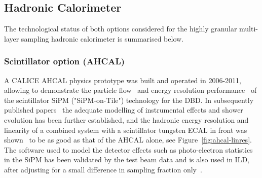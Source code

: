 \subsection{Hadronic Calorimeter}
\label{ild:sec:HCAL}

The technological status of both options considered for the highly granular multi-layer sampling hadronic calorimeter is summarised below. 

\subsubsection{Scintillator option (AHCAL)}

A CALICE AHCAL physics prototype was built and operated in 2006-2011, allowing to demonstrate the particle flow~\cite{Adloff:2011ha} and energy resolution performance~\cite{Adloff:2012gv} of the scintillator SiPM ("SiPM-on-Tile") technology for the DBD. In subsequently published papers~\cite{Adloff:2013vra,Adloff:2013kio,Adloff:2013jqa,Adloff:2014rya,Bilki:2014bga,Lucaci-Timoce:2013tkf,Price:2016sce} the adequate modelling of instrumental effects and shower evolution has been further established, and the hadronic energy resolution and linearity of a combined system with a scintillator tungsten ECAL in front was shown~\cite{Repond:2018flg} to be as good as that of the AHCAL alone, see Figure~\ref{fig:ahcal-linres}. The software used to model the detector effects such as photo-electron statistics in the SiPM has been validated by the test beam data and is also used in ILD, after adjusting for a small difference in sampling fraction only~\cite{Hartbrich:2016bbz}.
